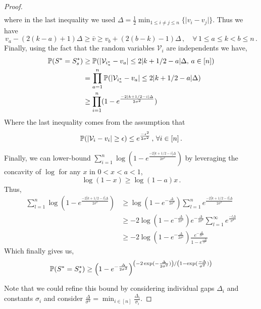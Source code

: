 \begin{proof}
\begin{align*}
\end{align*}
where in the last inequality we used $\Delta = \tfrac{1}{2}\min_{1\leq i \neq j \leq  n } \{\mid v_i - v_j \mid \}
$. Thus we have
\begin{equation}
    v_a - (2(k-a)+1)\Delta \geq \bar v \geq  v_b + (2(b-k)-1) \Delta \,, \quad \forall \, 1 \leq a \leq k < b \leq n \,.
\end{equation}
Finally, using the fact that the random variables $\mathcal{V}_i$ are independents we have,
\begin{align*}
    {\mathbb{P}}(S^*=S^*_s)      
    & \geq {\mathbb{P}}(|\mathcal{V}_{i_a^*} - v_a| \leq  2|k+1/2-a|\Delta, \,a \in [n]) \\
    & = \prod_{a=1}^n {\mathbb{P}}(|\mathcal{V}_{i_a^*} - v_a| \leq  2|k+1/2-a|\Delta) \\
    & \geq \prod_{i=1}^n  (1 - e^{\frac{-2|k+1/2-i|\Delta}{2\sigma^2}})
\end{align*}
Where the last inequality comes from the assumption that 
\begin{equation}
    {\mathbb{P}}( |\mathcal{V}_i-v_i| \geq \epsilon) \leq e^{\frac{-\epsilon^2}{2\sigma^2}} \,,\,\forall i \in [n]\,.
\end{equation}

Finally, we can lower-bound $\sum_{i=1}^n\log (1 - e^{\frac{-2|k+1/2-i|\Delta}{2\sigma^2}})$ by leveraging the concavity of $\log$ for any $x$ in $0<x<a<1$, %
\begin{equation}
    \log(1-x) \geq \log(1-a) x \,.
\end{equation}
Thus,
\begin{align}
    \sum_{l=1}^n\log (1 - e^{\frac{-2|k+1/2-l|\Delta}{2\sigma^2}}) 
    & \geq \log(1-e^{- \frac{\Delta}{2 \sigma^2}}) \sum_{l=1}^n e^{\frac{-2|k+1/2-l|\Delta}{2\sigma^2}} \\
    & \geq -2\log(1-e^{- \frac{\Delta}{2 \sigma^2}}) e^{- \frac{\Delta}{2 \sigma^2}} \sum_{l=1}^{\infty} e^{\frac{-l\Delta}{\sigma^2}} \\
    & \geq -2\log(1-e^{- \frac{\Delta}{2 \sigma^2}}) \frac{e^{- \frac{\Delta}{2 \sigma^2}} }{1 -  e^{\frac{-\Delta}{\sigma^2}}}
\end{align}
Which finally gives us,
\begin{equation}
     {\mathbb{P}}(S^*=S^*_s)    \geq \left( 1-e^{- \frac{\Delta}{2 \sigma^2}} \right)^{\left(-2 \exp(- \frac{\Delta}{2 \sigma^2})\right)/\left({1 -  \exp(\frac{-\Delta}{\sigma^2})}\right)}
\end{equation}



Note that we could refine this bound by considering individual gaps $\Delta_i$ and constants $\sigma_i$ and consider $\frac{\Delta}{\sigma^2} = \min_{i \in [n]} \frac{\Delta_i}{\sigma_i}$.

\end{proof}


